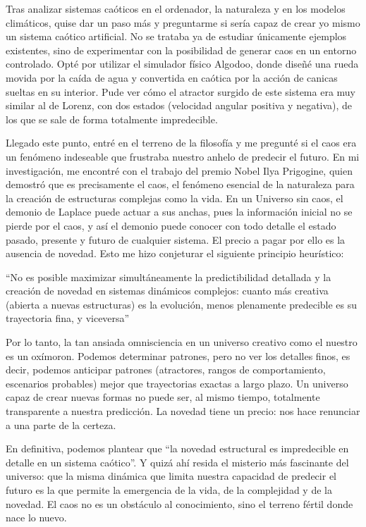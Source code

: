 \documentclass[
  10pt,
  a4paper,
  DIV=11,
  numbers=noendperiod,
  open=any]{scrreprt}
\numberwithin{equation}{chapter}
\numberwithin{equation}{section}
\renewcommand{\[}{\begin{equation}}
\renewcommand{\]}{\end{equation}}
\begin{document}
Tras analizar sistemas caóticos en el ordenador, la naturaleza y en los
modelos climáticos, quise dar un paso más y preguntarme si sería capaz
de crear yo mismo un sistema caótico artificial. No se trataba ya de
estudiar únicamente ejemplos existentes, sino de experimentar con la
posibilidad de generar caos en un entorno controlado. Opté por utilizar
el simulador físico Algodoo, donde diseñé una rueda movida por la caída
de agua y convertida en caótica por la acción de canicas sueltas en su
interior. Pude ver cómo el atractor surgido de este sistema era muy
similar al de Lorenz, con dos estados (velocidad angular positiva y
negativa), de los que se sale de forma totalmente impredecible.

Llegado este punto, entré en el terreno de la filosofía y me pregunté si
el caos era un fenómeno indeseable que frustraba nuestro anhelo de
predecir el futuro. En mi investigación, me encontré con el trabajo del
premio Nobel Ilya Prigogine, quien demostró que es precisamente el caos,
el fenómeno esencial de la naturaleza para la creación de estructuras
complejas como la vida. En un Universo sin caos, el demonio de Laplace
puede actuar a sus anchas, pues la información inicial no se pierde por
el caos, y así el demonio puede conocer con todo detalle el estado
pasado, presente y futuro de cualquier sistema. El precio a pagar por
ello es la ausencia de novedad. Esto me hizo conjeturar el siguiente
principio heurístico:

``No es posible maximizar simultáneamente la predictibilidad detallada y
la creación de novedad en sistemas dinámicos complejos: cuanto más
creativa (abierta a nuevas estructuras) es la evolución, menos
plenamente predecible es su trayectoria fina, y viceversa''

Por lo tanto, la tan ansiada omnisciencia en un universo creativo como
el nuestro es un oxímoron. Podemos determinar patrones, pero no ver los
detalles finos, es decir, podemos anticipar patrones (atractores, rangos
de comportamiento, escenarios probables) mejor que trayectorias exactas
a largo plazo. Un universo capaz de crear nuevas formas no puede ser, al
mismo tiempo, totalmente transparente a nuestra predicción. La novedad
tiene un precio: nos hace renunciar a una parte de la certeza.

En definitiva, podemos plantear que ``la novedad estructural es
impredecible en detalle en un sistema caótico''. Y quizá ahí resida el
misterio más fascinante del universo: que la misma dinámica que limita
nuestra capacidad de predecir el futuro es la que permite la emergencia
de la vida, de la complejidad y de la novedad. El caos no es un
obstáculo al conocimiento, sino el terreno fértil donde nace lo nuevo.
\end{document}
